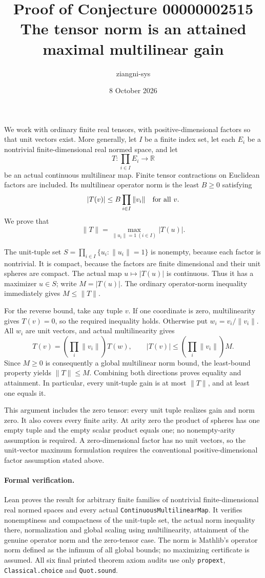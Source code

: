 \documentclass[11pt]{article}
\title{Proof of Conjecture 00000002515\\The tensor norm is an attained maximal multilinear gain}
\author{ziangni-sys}
\date{8 October 2026}
\begin{document}
\maketitle
We work with ordinary finite real tensors, with positive-dimensional factors so that unit vectors exist. More generally, let $I$ be a finite index set, let each $E_i$ be a nontrivial finite-dimensional real normed space, and let
\[
 T:\prod_{i\in I}E_i\longrightarrow\mathbb R
\]
be an actual continuous multilinear map. Finite tensor contractions on Euclidean factors are included. Its multilinear operator norm is the least $B\ge0$ satisfying
\[
 |T(v)|\le B\prod_{i\in I}\|v_i\|\quad\hbox{for all }v.
\]
We prove that
\[
 \|T\|=\max_{\|u_i\|=1\ (i\in I)}|T(u)|.
\]

The unit-tuple set $S=\prod_{i\in I}\{u_i:\|u_i\|=1\}$ is nonempty, because each factor is nontrivial. It is compact, because the factors are finite dimensional and their unit spheres are compact. The actual map $u\mapsto|T(u)|$ is continuous. Thus it has a maximizer $u\in S$; write $M=|T(u)|$. The ordinary operator-norm inequality immediately gives $M\le\|T\|$.

For the reverse bound, take any tuple $v$. If one coordinate is zero, multilinearity gives $T(v)=0$, so the required inequality holds. Otherwise put $w_i=v_i/\|v_i\|$. All $w_i$ are unit vectors, and actual multilinearity gives
\[
 T(v)=\left(\prod_i\|v_i\|\right)T(w),\qquad
 |T(v)|\le\left(\prod_i\|v_i\|\right)M.
\]
Since $M\ge0$ is consequently a global multilinear norm bound, the least-bound property yields $\|T\|\le M$. Combining both directions proves equality and attainment. In particular, every unit-tuple gain is at most $\|T\|$, and at least one equals it.

This argument includes the zero tensor: every unit tuple realizes gain and norm zero. It also covers every finite arity. At arity zero the product of spheres has one empty tuple and the empty scalar product equals one; no nonempty-arity assumption is required. A zero-dimensional factor has no unit vectors, so the unit-vector maximum formulation requires the conventional positive-dimensional factor assumption stated above.

\paragraph{Formal verification.}
Lean proves the result for arbitrary finite families of nontrivial finite-dimensional real normed spaces and every actual \texttt{ContinuousMultilinearMap}. It verifies nonemptiness and compactness of the unit-tuple set, the actual norm inequality there, normalization and global scaling using multilinearity, attainment of the genuine operator norm and the zero-tensor case. The norm is Mathlib's operator norm defined as the infimum of all global bounds; no maximizing certificate is assumed. All six final printed theorem axiom audits use only \texttt{propext}, \texttt{Classical.choice} and \texttt{Quot.sound}.
\end{document}
